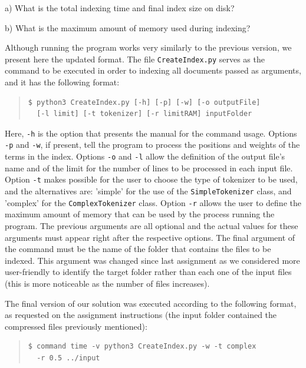 \documentclass[12pt]{article}
\begin{document}
a) What is the total indexing time and final index size on disk?

b) What is the maximum amount of memory used during indexing?

Although running the program works very similarly to the previous version, we
present here the updated format.
The file \texttt{CreateIndex.py} serves as the command to be executed in order to 
indexing all documents passed as arguments, and it has the following format:

\begingroup
\addtolength\leftmargini{-0.4in}
\addtolength\baselineskip{-0.05in}
\begin{quote}
\begin{verbatim}
$ python3 CreateIndex.py [-h] [-p] [-w] [-o outputFile] 
  [-l limit] [-t tokenizer] [-r limitRAM] inputFolder
\end{verbatim}
\end{quote}
\endgroup

Here, \texttt{-h} is the option that presents the manual for the command usage.
Options \texttt{-p} and \texttt{-w}, if present, tell the program to process the
positions and weights of the terms in the index.
Options \texttt{-o} and \texttt{-l} allow the definition of the output file's 
name and of the limit for the number of lines to be processed in each input file.
Option \texttt{-t} makes possible for the user to choose the type of tokenizer
to be used, and the alternatives are: 'simple' for the use of the 
\texttt{SimpleTokenizer} class, and 'complex' for the \texttt{ComplexTokenizer} class.
Option \texttt{-r} allows the user to define the maximum amount of memory that can
be used by the process running the program.
The previous arguments are all optional and the actual values for these arguments
must appear right after the respective options.
The final argument of the command must be the name of the folder that contains the
files to be indexed. This argument was changed since last assignment as we considered
more user-friendly to identify the target folder rather than each one of the input files
(this is more noticeable as the number of files increases).

The final version of our solution was executed according to the following format,
as requested on the assignment instructions (the input folder contained the compressed
files previously mentioned):

\begingroup
\addtolength\leftmargini{-0.4in}
\addtolength\baselineskip{-0.05in}
\begin{quote}
\begin{verbatim}
$ command time -v python3 CreateIndex.py -w -t complex
  -r 0.5 ../input
\end{verbatim}
\end{quote}
\endgroup
\end{document}
